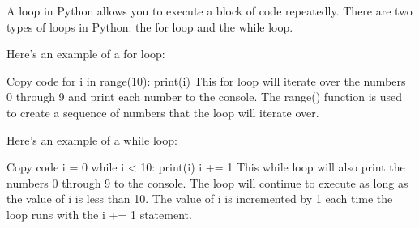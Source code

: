 


	
\subtitle{A Loop}
A loop in Python allows you to execute a block of code repeatedly. There are two types of loops in Python: the for loop and the while loop.

Here's an example of a for loop:

Copy code
for i in range(10):
    print(i)
This for loop will iterate over the numbers 0 through 9 and print each number to the console. The range() function is used to create a sequence of numbers that the loop will iterate over.

Here's an example of a while loop:

Copy code
i = 0
while i < 10:
    print(i)
    i += 1
This while loop will also print the numbers 0 through 9 to the console. The loop will continue to execute as long as the value of i is less than 10. The value of i is incremented by 1 each time the loop runs with the i += 1 statement.

